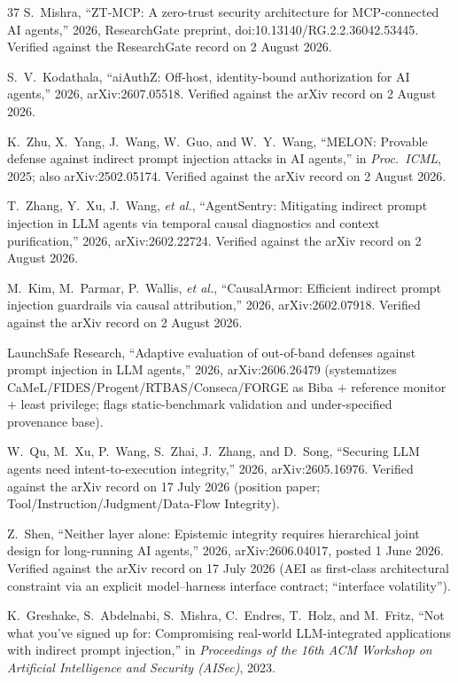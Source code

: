 \documentclass[conference]{IEEEtran}
\begin{document}
\begin{thebibliography}{37}
 S.~Mishra, ``ZT-MCP: A zero-trust security
architecture for MCP-connected AI agents,'' 2026, ResearchGate
preprint, doi:10.13140/RG.2.2.36042.53445. Verified against the
ResearchGate record on 2 August 2026.

 S.~V.~Kodathala, ``aiAuthZ:
Off-host, identity-bound authorization for AI agents,'' 2026,
arXiv:2607.05518. Verified against the arXiv record on 2 August
2026.

 K.~Zhu, X.~Yang, J.~Wang, W.~Guo, and W.~Y.~Wang,
``MELON: Provable defense against indirect prompt injection
attacks in AI agents,'' in \emph{Proc.\ ICML}, 2025; also
arXiv:2502.05174. Verified against the arXiv record on 2 August
2026.

 T.~Zhang, Y.~Xu, J.~Wang, \emph{et al.},
``AgentSentry: Mitigating indirect prompt injection in LLM agents
via temporal causal diagnostics and context purification,'' 2026,
arXiv:2602.22724. Verified against the arXiv record on 2 August
2026.

 M.~Kim, M.~Parmar, P.~Wallis, \emph{et al.},
``CausalArmor: Efficient indirect prompt injection guardrails via
causal attribution,'' 2026, arXiv:2602.07918. Verified against the
arXiv record on 2 August 2026.

 LaunchSafe Research, ``Adaptive evaluation of
out-of-band defenses against prompt injection in LLM agents,''
2026, arXiv:2606.26479 (systematizes
CaMeL/FIDES/Progent/RTBAS/Conseca/FORGE as Biba $+$ reference
monitor $+$ least privilege; flags static-benchmark validation and
under-specified provenance base).

 W.~Qu, M.~Xu, P.~Wang, S.~Zhai, J.~Zhang, and
D.~Song, ``Securing LLM agents need intent-to-execution
integrity,'' 2026, arXiv:2605.16976. Verified against the arXiv
record on 17 July 2026 (position paper; Tool/Instruction/Judgment/Data-Flow Integrity).

 Z.~Shen, ``Neither layer alone: Epistemic integrity
requires hierarchical joint design for long-running AI agents,''
2026, arXiv:2606.04017, posted 1 June 2026. Verified against the
arXiv record on 17 July 2026 (AEI as first-class architectural
constraint via an explicit model--harness interface contract;
``interface volatility'').

 K.~Greshake, S.~Abdelnabi, S.~Mishra,
C.~Endres, T.~Holz, and M.~Fritz, ``Not what you've signed up
for: Compromising real-world LLM-integrated applications with
indirect prompt injection,'' in \emph{Proceedings of the 16th ACM
Workshop on Artificial Intelligence and Security (AISec)}, 2023.


\end{thebibliography}
\end{document}
